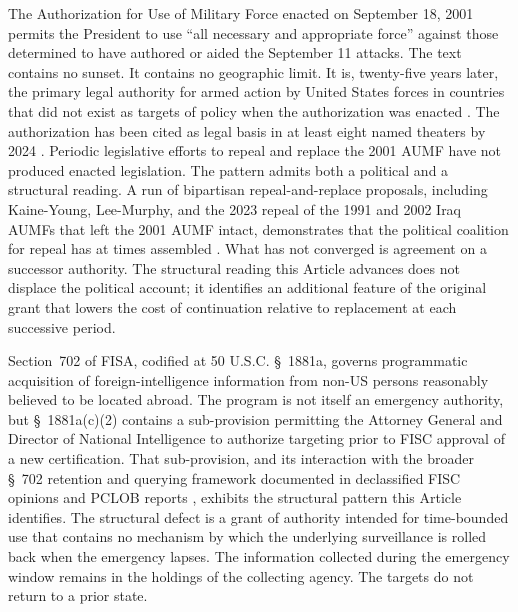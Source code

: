The Authorization for Use of Military Force enacted on September 18, 2001 \cite{ref_aumf_2001}
permits the President to use ``all necessary and appropriate force'' against those determined to have
authored or aided the September 11 attacks.
The text contains no sunset.
It contains no geographic limit.
It is, twenty-five years later, the primary legal authority for armed action by United States forces
in countries that did not exist as targets of policy when the authorization was enacted
\cite{ref_brennan_center_aumf,ref_chesney_aumf}.
The authorization has been cited as legal basis in at least eight named theaters by 2024
\cite{ref_jaffer_aumf}.
Periodic legislative efforts to repeal and replace the 2001 AUMF have not produced enacted legislation.
The pattern admits both a political and a structural reading.
A run of bipartisan repeal-and-replace proposals,
including Kaine-Young, Lee-Murphy, and the 2023 repeal of the 1991 and 2002 Iraq AUMFs that left the 2001 AUMF intact,
demonstrates that the political coalition for repeal has at times assembled
\cite{ref_kaine_young_aumf,ref_iraq_aumf_repeal_2023}.
What has not converged is agreement on a successor authority.
The structural reading this Article advances does not displace the political account;
it identifies an additional feature of the original grant that lowers the cost of continuation
relative to replacement at each successive period.

Section~702 of FISA, codified at 50 U.S.C. \S~1881a, governs programmatic acquisition of foreign-intelligence information
from non-US persons reasonably believed to be located abroad.
The program is not itself an emergency authority,
but \S~1881a(c)(2) contains a sub-provision permitting the Attorney General and Director of National Intelligence
to authorize targeting prior to FISC approval of a new certification.
That sub-provision, and its interaction with the broader \S~702 retention and querying framework documented in
declassified FISC opinions and PCLOB reports
\cite{ref_pclob_702_report,ref_fisc_702_opinions},
exhibits the structural pattern this Article identifies.
The structural defect is a grant of authority intended for time-bounded use that contains no
mechanism by which the underlying surveillance is rolled back when the emergency lapses.
The information collected during the emergency window remains in the holdings of the collecting agency.
The targets do not return to a prior state.

